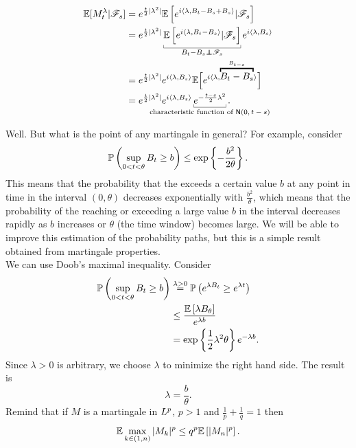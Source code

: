 \documentclass[12pt]{report}
\begin{document}
\begin{fancyproof}
\begin{enumerate}
	\begin{align*}
		\evs[M_{t}^{\lambda}|\F_{s}]&=e^{\frac{t}{2}|\lambda^{2}|}\evs\left[e^{i\inprod{\lambda,B_{t}-B_{s}+B_{s}}}|\F_{s}\right]\\
		&=e^{\frac{t}{2}|\lambda^{2}|}\ubracketthin{\evs\left[e^{i\inprod{\lambda, B_{t}-B_{s}}}|\F_{s}\right]}_{B_{t}-B_{s}\independent\F_{s}}e^{i\inprod{\lambda, B_{s}}}\\
		&=e^{\frac{t}{2}|\lambda^{2}|}e^{i\inprod{\lambda, B_{s}}}\evs\Bigl[e^{i\inprod{\lambda,\overbracket{B_{t}-B_{s}}^{B_{t-s}}}}\Bigr]\\
		&=e^{\frac{t}{2}|\lambda^{2}|}e^{i\inprod{\lambda,B_{s}}}\ubracketthin{e^{-\frac{t-s}{2}\lambda^{2}}}_{\claptext{characteristic function of $\mathsf{N}(0,t-s)$}}.
	\end{align*}
\end{enumerate}
\end{fancyproof}
Well. But what is the point of any martingale in general? For example, consider
\begin{equation*}
	\mathbb{P}\left(\sup_{0<t<\theta}B_{t}\geq b\right)\leq\exp\left\{-\frac{b^{2}}{2\theta}\right\}.
\end{equation*}
This means that the probability that the \bwm{} exceeds a certain value $b$ at any point in time in the interval $(0,\theta)$ decreases exponentially with $\frac{b^{2}}{\theta}$, which means that the probability of the \bwm{} reaching or exceeding a large value $b$ in the interval decreases rapidly as $b$ increases or $\theta$ (the time window) becomes large. We will be able to improve this estimation of the probability paths, but this is a simple result obtained from martingale properties.\\
We can use Doob's maximal inequality. Consider
\begin{align*}
	\mathbb{P}\left(\sup_{0<t<\theta}B_{t}\geq b\right)&\stackrel{\lambda>0}{=}\mathbb{P}\left(e^{\lambda B_{t}}\geq e^{\lambda t}\right)\\
	&\leq\frac{\mathbb{E}\left[\lambda B_{\theta}\right]}{e^{\lambda b}}\\
	&=\exp\left\{\frac{1}{2}\lambda^{2}\theta\right\}e^{-\lambda b}.
\end{align*}
Since $\lambda>0$ is arbitrary, we choose $\lambda$ to minimize the right hand side. The result is 
\begin{equation*}
	\lambda=\frac{b}{\theta}.
\end{equation*}
Remind that if $M$ is a martingale in $L^{p}$, $p>1$ and $\frac{1}{p}+\frac{1}{q}=1$ then
\begin{equation*}
	\mathbb{E}\max_{k\in(1,n)}|M_{k}|^{p}\leq q^{p}\mathbb{E}\left[|M_{n}|^{p}\right].
\end{equation*}
\end{document}
